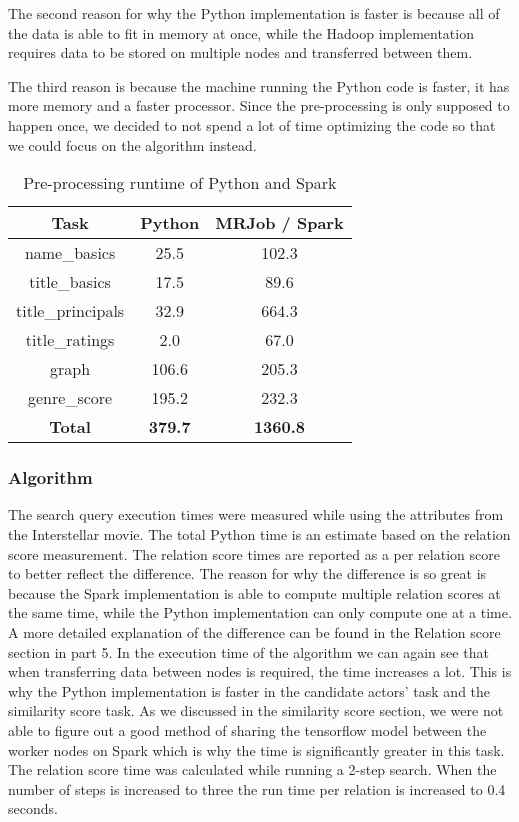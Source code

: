 The second reason for why the Python implementation is faster is because all of the data is able to fit in memory at once, while the Hadoop implementation requires data to be stored on multiple nodes and transferred between them. 

The third reason is because the machine running the Python code is faster, it has more memory and a faster processor. Since the pre-processing is only supposed to happen once, we decided to not spend a lot of time optimizing the code so that we could focus on the algorithm instead.


\begin{table}
\centering
    \begin{tabular}{ |c|c|c| } 
        \hline
        \textbf{Task} & \textbf{Python} & \textbf{MRJob / Spark} \\ 
        \hline
        name\_basics & 25.5 & 102.3 \\ 
        title\_basics & 17.5 & 89.6 \\
        title\_principals & 32.9 & 664.3 \\ 
        title\_ratings & 2.0 & 67.0 \\ 
        graph & 106.6 & 205.3 \\ 
        genre\_score & 195.2 & 232.3 \\ \hline
        \textbf{Total} & \textbf{379.7} & \textbf{1360.8} \\ 
        \hline
    \end{tabular}
    \caption{Pre-processing runtime of Python and Spark}
    \label{tab:preprocess runtime}
\end{table}


\subsubsection{Algorithm}

The search query execution times were measured while using the attributes from the Interstellar movie. The total Python time is an estimate based on the relation score measurement. The relation score times are reported as a per relation score to better reflect the difference. The reason for why the difference is so great is because the Spark implementation is able to compute multiple relation scores at the same time, while the Python implementation can only compute one at a time. A more detailed explanation of the difference can be found in the Relation score section in part 5. In the execution time of the algorithm we can again see that when transferring data between nodes is required, the time increases a lot. This is why the Python implementation is faster in the candidate actors’ task and the similarity score task. As we discussed in the similarity score section, we were not able to figure out a good method of sharing the tensorflow model between the worker nodes on Spark which is why the time is significantly greater in this task. The relation score time was calculated while running a 2-step search. When the number of steps is increased to three the run time per relation is increased to 0.4 seconds.

